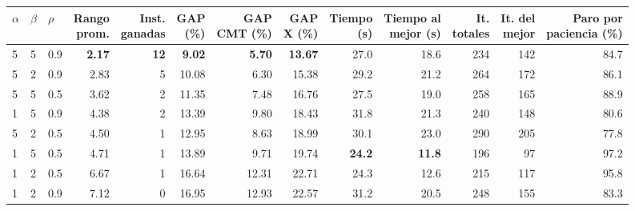 \begin{tabular}{lllrrrrrrrrrr}
\toprule
$\alpha$ & $\beta$ & $\rho$ & \makecell{Rango\\prom.} & \makecell{Inst.\\ganadas} & \makecell{GAP\\(\%)} & \makecell{GAP\\CMT (\%)} & \makecell{GAP\\X (\%)} & \makecell{Tiempo\\(s)} & \makecell{Tiempo al\\mejor (s)} & \makecell{It.\\totales} & \makecell{It. del\\mejor} & \makecell{Paro por\\paciencia (\%)} \\
\midrule
5 & 5 & 0.9 & \textbf{2.17} & \textbf{12} & \textbf{9.02} & \textbf{5.70} & \textbf{13.67} & 27.0 & 18.6 & 234 & 142 & 84.7 \\
5 & 2 & 0.9 & 2.83 & 5 & 10.08 & 6.30 & 15.38 & 29.2 & 21.2 & 264 & 172 & 86.1 \\
5 & 5 & 0.5 & 3.62 & 2 & 11.35 & 7.48 & 16.76 & 27.5 & 19.0 & 258 & 165 & 88.9 \\
1 & 5 & 0.9 & 4.38 & 2 & 13.39 & 9.80 & 18.43 & 31.8 & 21.3 & 240 & 148 & 80.6 \\
5 & 2 & 0.5 & 4.50 & 1 & 12.95 & 8.63 & 18.99 & 30.1 & 23.0 & 290 & 205 & 77.8 \\
1 & 5 & 0.5 & 4.71 & 1 & 13.89 & 9.71 & 19.74 & \textbf{24.2} & \textbf{11.8} & 196 & 97 & 97.2 \\
1 & 2 & 0.5 & 6.67 & 1 & 16.64 & 12.31 & 22.71 & 24.3 & 12.6 & 215 & 117 & 95.8 \\
1 & 2 & 0.9 & 7.12 & 0 & 16.95 & 12.93 & 22.57 & 31.2 & 20.5 & 248 & 155 & 83.3 \\
\bottomrule
\end{tabular}
